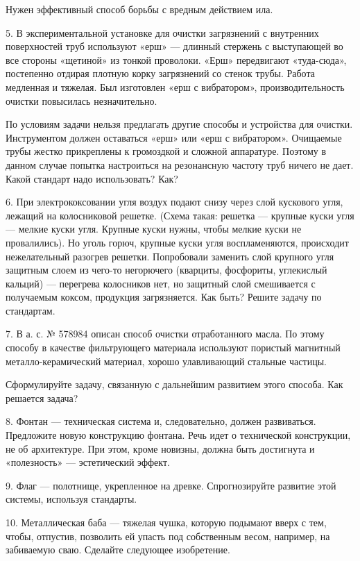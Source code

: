 Нужен эффективный способ борьбы с вредным действием ила.

5. В экспериментальной установке  для очистки загрязнений с внутренних
поверхностей труб  используют «ерш»  — длинный стержень  с выступающей
во  все  стороны  «щетиной»  из тонкой  проволоки.  «Ерш»  передвигают
«туда-сюда», постепенно  отдирая плотную  корку загрязнений  со стенок
трубы. Работа медленная и тяжелая.  Был изготовлен «ерш с вибратором»,
производительность очистки повысилась незначительно.

По условиям задачи  нельзя предлагать другие способы  и устройства для
очистки. Инструментом должен оставаться  «ерш» или «ерш с вибратором».
Очищаемые трубы жестко прикреплены  к громоздкой и сложной аппаратуре.
Поэтому  в данном  случае попытка  настроиться на  резонансную частоту
труб ничего не дает. Какой стандарт надо использовать? Как?

6. При электрококсовании угля воздух подают снизу через слой кускового
угля,  лежащий  на  колосниковой  решетке.  (Схема  такая:  решетка  —
крупные куски  угля —  мелкие куски угля.  Крупные куски  нужны, чтобы
мелкие  куски не  провалились).  Но уголь  горюч,  крупные куски  угля
воспламеняются, происходит нежелательный разогрев решетки. Попробовали
заменить  слой  крупного угля  защитным  слоем  из чего-то  негорючего
(кварциты,  фосфориты,  углекислый  кальций)  —  перегрева  колосников
нет,  но  защитный слой  смешивается  с  получаемым коксом,  продукция
загрязняется. Как быть? Решите задачу по стандартам.

7. В  а. с.  № 578984  описан способ  очистки отработанного  масла. По
этому способу  в качестве  фильтрующего материала  используют пористый
магнитный металло-керамический материал,  хорошо улавливающий стальные
частицы.

Сформулируйте задачу, связанную с  дальнейшим развитием этого способа.
Как решается задача?

8. Фонтан — техническая  система и, следовательно, должен развиваться.
Предложите  новую   конструкцию  фонтана.  Речь  идет   о  технической
конструкции, не об  архитектуре. При этом, кроме  новизны, должна быть
достигнута и «полезность» — эстетический эффект.

9. Флаг  — полотнище,  укрепленное на древке.  Спрогнозируйте развитие
этой системы, используя стандарты.

10. Металлическая баба — тяжелая  чушка, которую подымают вверх с тем,
чтобы, отпустив, позволить ей  упасть под собственным весом, например,
на забиваемую сваю. Сделайте следующее изобретение.

